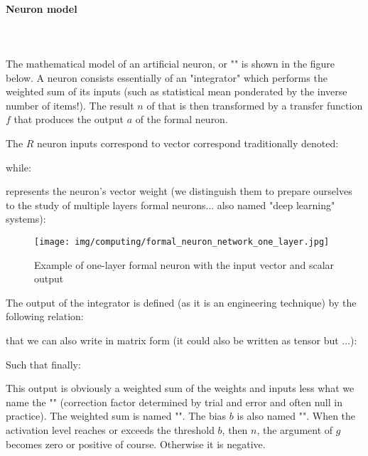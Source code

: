 	\paragraph{Neuron model}\mbox{}\\\\
	The mathematical model of an artificial neuron, or "" is shown in the figure below. A neuron consists essentially of an "integrator" which performs the weighted sum of its inputs (such as statistical mean ponderated by the inverse number of items!). The result $n$ of that is then transformed by a transfer function $f$ that produces the output $a$ of the formal neuron.

	The $R$ neuron inputs  correspond to vector correspond traditionally denoted:
	
	while:
	
	represents the neuron's vector weight (we distinguish them to prepare ourselves to the study of multiple layers formal neurons... also named "deep learning" systems):
	\begin{figure}[H]
		\centering
		\texttt{[image: img/computing/formal\_neuron\_network\_one\_layer.jpg]}
		\caption{Example of one-layer formal neuron with the input vector and scalar output}
	\end{figure}
	The output of the integrator is defined (as it is an engineering technique) by the following relation:
	
	that we can also write in matrix form (it could also be written as tensor but ...):
	
	Such that finally:
	
	This output is obviously a weighted sum of the weights and inputs less what we name the "" (correction factor determined by trial and error and often null in practice). The weighted sum is named "". The bias $b$ is also named "". When the activation level reaches or exceeds the threshold $b$, then $n$, the argument of $g$ becomes zero or positive of course. Otherwise it is negative.

